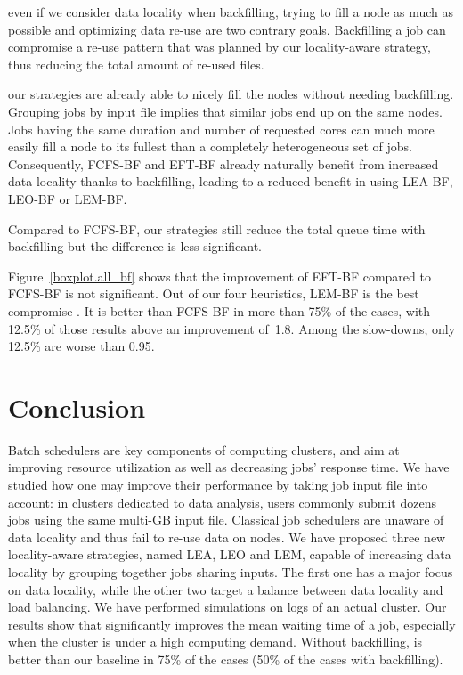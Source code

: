 \documentclass[sigconf,review,anonymous]{acmart}
\newcommand{\rev}[1]{{\color{black}{#1}}}
\begin{document}
\rev{Firstly,} even if we consider data locality when backfilling, trying to fill a node as much as possible and optimizing data re-use are two contrary goals. 
Backfilling a job can compromise a re-use pattern that was planned by our locality-aware strategy,
thus reducing the total amount of re-used files.

\rev{Secondly,} our strategies are already able to nicely fill the nodes without needing backfilling.
Grouping jobs by input file implies that similar jobs end up on the same nodes.
Jobs having the same duration and number of requested cores can much more easily fill a node to its fullest than a completely heterogeneous set of jobs.
Consequently, FCFS-BF and EFT-BF already naturally benefit from increased data locality thanks to backfilling, leading to a reduced benefit in using LEA-BF, LEO-BF or LEM-BF.

Compared to FCFS-BF, our strategies still reduce the total queue time with backfilling but the difference is less significant.

Figure~\ref{boxplot.all_bf} shows that the improvement of EFT-BF compared to FCFS-BF is not significant.
Out of our four heuristics, LEM-BF is the best compromise \rev{here}.
It is better than FCFS-BF in more than 75\% of the cases, 
with 12.5\% of those results above an improvement of~1.8.
Among the slow-downs, only 12.5\% are worse than 0.95.

\section{Conclusion}\label{sec.conclusion}

Batch schedulers are key components of computing clusters, and aim at
improving resource utilization as well as decreasing jobs' response
time. We have studied how one may improve their performance by taking
job input file into account: in clusters dedicated to data analysis,
users commonly submit dozens jobs using the same multi-GB input
file. Classical job schedulers are unaware of data locality and thus
fail to re-use data on nodes. We have proposed three new locality-aware
strategies, named LEA, LEO and LEM,
capable of increasing data locality by grouping together 
jobs sharing inputs. The first one has a major focus on data locality,
while the other two target a balance between data locality and load
balancing. We have performed simulations on logs of an actual
cluster. Our results show that \rev{LEA} significantly improves the mean
waiting time of a job, especially  
when the cluster is under a high computing demand.
Without backfilling, \rev{LEA} is better than our baseline in 75\% of the
cases (50\% of the cases with backfilling).
\rev{Our strategy called LEM is the best compromise. LEM is better than the baseline in more than 75\% of the cases with or without backfilling
(with a median improvement of 7.5\% compared to our baseline without backfilling).}
\end{document}
